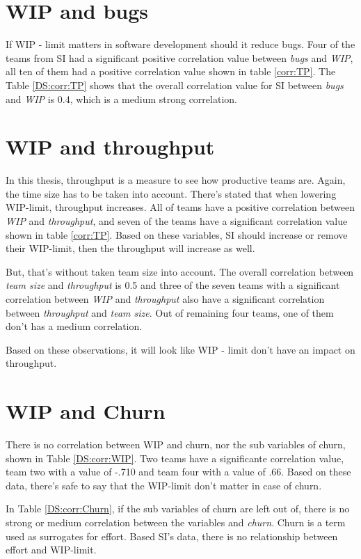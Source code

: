 \documentclass[UKenglish]{ifimaster}  %
\begin{document}
\section{WIP and bugs} 
If WIP - limit matters in software development should it reduce bugs. Four of the teams from SI had a significant positive correlation value between \textit{bugs} and \textit{WIP}, all ten of them had a positive correlation value shown in table \ref{corr:TP}. The Table \ref{DS:corr:TP} shows that the overall correlation value for SI between  \textit{bugs} and \textit{WIP} is 0.4, which is a medium strong correlation. 



\section{WIP and throughput} 
In this thesis, throughput is a measure to see how productive teams are. Again, the time size has to be taken into account. 
There's stated that when lowering WIP-limit, throughput increases. All of teams have a positive correlation between \textit{WIP} and \textit{throughput}, and seven of the teams have a significant correlation value shown in table \ref{corr:TP}. Based on these variables, SI should increase or remove their WIP-limit, then the throughput will increase as well. 

But, that's without taken team size into account. The overall correlation between  \textit{team size} and \textit{throughput} is 0.5 and three of the seven teams with a significant correlation between \textit{WIP} and \textit{throughput} also have a significant correlation between \textit{throughput} and \textit{team size}. Out of remaining four teams, one of them don't has a medium correlation. 

Based on these observations, it will look like WIP - limit don't have an impact on throughput. 

\section{WIP and Churn}
There is no correlation between WIP and churn, nor the sub variables of churn, shown in Table \ref{DS:corr:WIP}. Two teams have a significante correlation value, team two with a value of -.710 and team four with a value of .66. Based on these data, there's safe to say that the WIP-limit don't matter in case of churn. 

In Table \ref{DS:corr:Churn}, if the sub variables of churn are left out of, there is no strong or medium correlation between the variables and \textit{churn}. Churn is a term used as surrogates for effort. Based SI's data, there is no relationship between effort and WIP-limit.  
\end{document}
